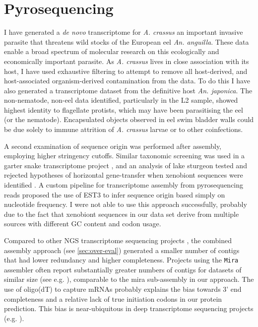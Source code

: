\section{Pyrosequencing}
\label{sec:454-pyr}

I have generated a \textit{de novo} transcriptome for \textit{A. crassus} an
important invasive parasite that threatens wild stocks of the European
eel \textit{An. anguilla}. These data enable a broad spectrum of
molecular research on this ecologically and economically important
parasite. As \textit{A. crassus} lives in close association with its
host, I have used exhaustive filtering to attempt to remove all
host-derived, and host-associated organism-derived contamination from
the data. To do this I have also generated a transcriptome dataset
from the definitive host \textit{An. japonica}. The non-nematode,
non-eel data identified, particularly in the L2 sample, showed highest
identity to flagellate protists, which may have been parasitising the
eel (or the nematode). Encapsulated objects observed in eel swim
bladder walls \cite{heitlinger_massive_2009} could be due solely to
immune attrition of \textit{A. crassus} larvae or to other
coinfections.

A second examination of sequence origin was performed after assembly,
employing higher stringency cutoffs. Similar taxonomic screening was
used in a garter snake transcriptome project \cite{pmid21138572}, and
an analysis of lake sturgeon tested and rejected hypotheses of
horizontal gene-transfer when xenobiont sequences were identified
\cite{pmid20386959}. A custom pipeline for transcriptome assembly from
pyrosequencing reads \cite{pmid20034392} proposed the use of EST3
\cite{pmid17218127} to infer sequence origin based simply on
nucleotide frequency. I were not able to use this approach
successfully, probably due to the fact that xenobiont sequences in our
data set derive from multiple sources with different GC content and
codon usage.

Compared to other NGS transcriptome sequencing projects
\cite{pmid20478048}, the combined assembly approach (see
\ref{sec:over-eval}) generated a smaller number of contigs that had
lower redundancy and higher completeness. Projects using the
\texttt{Mira} assembler often report substantially greater numbers of
contigs for datasets of similar size (see e.g. \cite{pmid21364769}),
comparable to the mira sub-assembly in our approach. The use of
oligo(dT) to capture mRNAs probably explains the bias towards 3' end
completeness and a relative lack of true initiation codons in our
protein prediction. This bias is near-ubiquitous in deep transcriptome
sequencing projects (e.g. \cite{pmid20331785}).

